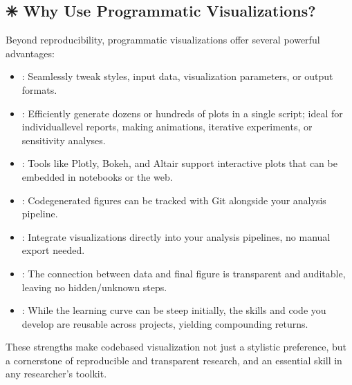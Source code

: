 \documentclass[letterpaper,10pt,english]{jupyterBook}
\begin{document}
\subsection{✳️ Why Use Programmatic Visualizations?}
\label{\detokenize{chapters/03/03a_programmatic-visualizations:why-use-programmatic-visualizations}}
\sphinxAtStartPar
Beyond reproducibility, programmatic visualizations offer several powerful advantages:
\begin{itemize}
\item {} 
\sphinxAtStartPar
{}: Seamlessly tweak styles, input data, visualization parameters, or output formats.

\item {} 
\sphinxAtStartPar
{}: Efficiently generate dozens or hundreds of plots in a single script; ideal for individual\sphinxhyphen{}level reports, making animations, iterative experiments, or sensitivity analyses.

\item {} 
\sphinxAtStartPar
{}: Tools like Plotly, Bokeh, and Altair support interactive plots that can be embedded in notebooks or the web.

\item {} 
\sphinxAtStartPar
{}: Code\sphinxhyphen{}generated figures can be tracked with Git alongside your analysis pipeline.

\item {} 
\sphinxAtStartPar
{}: Integrate visualizations directly into your analysis pipelines, no manual export needed.

\item {} 
\sphinxAtStartPar
{}: The connection between data and final figure is transparent and auditable, leaving no hidden/unknown steps.

\item {} 
\sphinxAtStartPar
{}: While the learning curve can be steep initially, the skills and code you develop are reusable across projects, yielding compounding returns.

\end{itemize}

\sphinxAtStartPar
These strengths make code\sphinxhyphen{}based visualization not just a stylistic preference, but a cornerstone of reproducible and transparent research, and an essential skill in any researcher’s toolkit.
\end{document}

